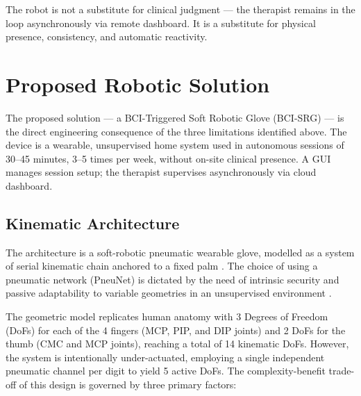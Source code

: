 \documentclass[11pt,a4paper]{article}
\begin{document}
The robot is not a substitute for clinical judgment — the therapist remains 
in the loop asynchronously via remote dashboard. It is a substitute for 
physical presence, consistency, and automatic reactivity.


\section{Proposed Robotic Solution}

The proposed solution — a BCI-Triggered Soft Robotic Glove (BCI-SRG) — 
is the direct engineering consequence of the three limitations identified 
above. The device is a wearable, unsupervised home system used in 
autonomous sessions of 30--45 minutes, 3--5 times per week, without 
on-site clinical presence. A GUI manages session setup; the 
therapist supervises asynchronously via cloud dashboard.

\subsection{Kinematic Architecture}

The architecture is a soft-robotic pneumatic wearable glove, modelled as a system of serial kinematic chain anchored 
to a fixed palm \cite{proietti2024combining, fiska2025integration}.
The choice of using a pneumatic network (PneuNet) is dictated by 
the need of intrinsic security and passive adaptability to variable 
geometries in an unsupervised environment \cite{proietti2024combining, 
osuagwu2020home}.

The geometric model replicates human anatomy with 3 Degrees of Freedom (DoFs) for each of the 4 fingers (MCP, PIP, and DIP joints) 
and 2 DoFs for the thumb (CMC and MCP joints), reaching a total of 14 kinematic DoFs. However, the system is intentionally under-actuated, 
employing a single independent pneumatic channel per digit to yield 5 active DoFs. The complexity-benefit trade-off of this design is governed 
by three primary factors:
\end{document}
